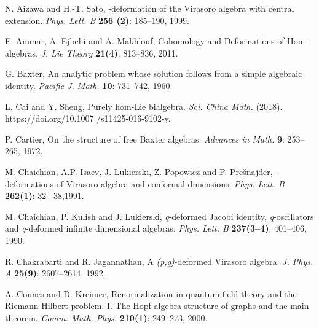 \documentclass[a4paper,11pt]{amsart}
\theoremstyle{plain}
\theoremstyle{definition}
\theoremstyle{remark}
\numberwithin{equation}{section}
\begin{document}


\begin{thebibliography}{999}
\newblock N. Aizawa and H.-T. Sato, 
-deformation of the Virasoro algebra with central extension.
 {\it Phys. Lett. B} \textbf{256 (2)}: 185--190, 1999.

F. Ammar, A. Ejbehi and A. Makhlouf,
Cohomology and Deformations of Hom-algebras.
{\it J. Lie Theory} \textbf{21(4)}: 813--836, 2011.


G. Baxter, 
An analytic problem whose solution follows from a simple algebraic identity.
\textit{Pacific J. Math.} \textbf{10}: 731--742,  1960.

L. Cai and Y. Sheng, 
Purely hom-Lie bialgebra. 
\textit{Sci. China Math.} (2018). 
https://doi.org/10.1007 /s11425-016-9102-y.


P. Cartier,
On the structure of free Baxter algebras.
\textit{Advances in Math.} \textbf{9}: 253--265, 1972.


\newblock M. Chaichian, A.P. Isaev, J. Lukierski, Z. Popowicz and P. Prešnajder,
-deformations of Virasoro algebra and
conformal dimensions. {\it Phys. Lett. B} \textbf{262(1)}: 32–-38,1991.

M. Chaichian, P. Kulish and J. Lukierski, {\it q}-deformed Jacobi identity,  {\it q}-oscillators and {\it q}-deformed infinite dimensional
algebras.  {\it Phys. Lett. B} \textbf{237(3–4)}: 401--406, 1990.

R. Chakrabarti and R. Jagannathan, A {\it(p,q)}-deformed Virasoro algebra.  {\it J. Phys. A} \textbf{25(9)}: 2607--2614, 1992.



A. Connes and D. Kreimer, 
Renormalization in quantum field theory and the Riemann-Hilbert problem. I. The Hopf algebra structure of graphs and the main theorem.
\textit{ Comm. Math. Phys.} \textbf{210(1)}:
249--273, 2000.




\end{thebibliography}
\end{document}
